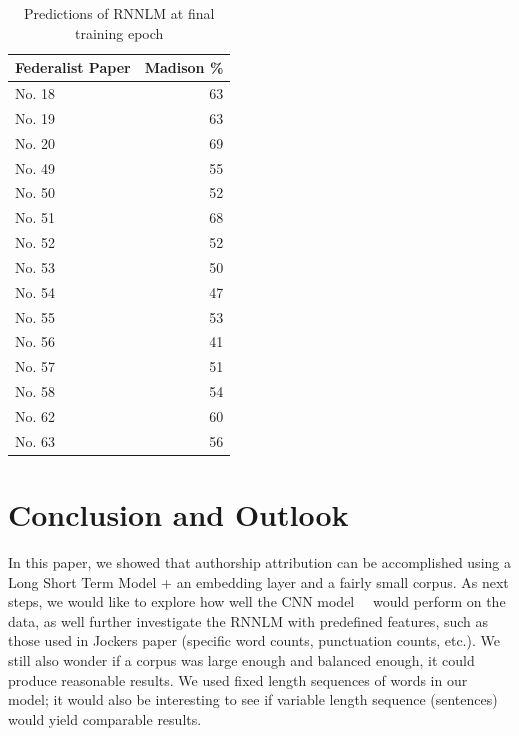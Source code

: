 \documentclass[11pt]{article}
\begin{document}
\begin{table}[t]
	\centering
	\begin{tabular}{lr}
		\toprule
		\bf Federalist Paper &   \bf Madison \% \\
		\midrule
		No. 18 & 63 \\
		No. 19 & 63 \\
		No. 20 & 69 \\
		No. 49 & 55 \\
		No. 50 & 52 \\
		No. 51 & 68 \\
		No. 52 & 52 \\
		No. 53 & 50 \\
		No. 54 & 47 \\
		No. 55 & 53 \\
		No. 56 & 41 \\
		No. 57 & 51 \\
		No. 58 & 54 \\
		No. 62 & 60 \\
		No. 63 & 56 \\
		\bottomrule
	\end{tabular}
	\caption{\label{final results}  Predictions of RNNLM at final training epoch}
\end{table}


\section{Conclusion and Outlook}
In this paper, we showed that authorship attribution can be accomplished using a Long Short Term Model + an embedding layer and a fairly small corpus. As next steps, we would like to explore how well the CNN model~\cite{Ruder:16}~\cite{Shrestha:17} would perform on the data, as well further investigate the RNNLM with predefined features, such as those used in Jockers paper (specific word counts, punctuation counts, etc.). We still also wonder if a corpus was large enough and balanced enough, it could produce reasonable results. We used fixed length sequences of words in our model; it would also be interesting to see if variable length sequence (sentences) would yield comparable results.
\end{document}
